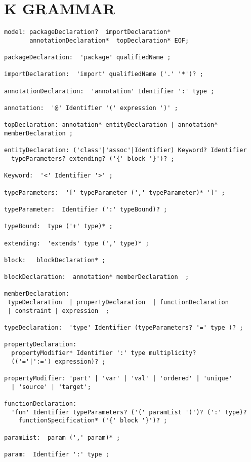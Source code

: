 \newpage
\section{K GRAMMAR}
\label{app:grammar}

{\scriptsize 

\begin{verbatim}
model: packageDeclaration?  importDeclaration*  
       annotationDeclaration*  topDeclaration* EOF;

packageDeclaration:  'package' qualifiedName ;

importDeclaration:  'import' qualifiedName ('.' '*')? ;

annotationDeclaration:  'annotation' Identifier ':' type ;

annotation:  '@' Identifier '(' expression ')' ;

topDeclaration: annotation* entityDeclaration | annotation* memberDeclaration ;

entityDeclaration: ('class'|'assoc'|Identifier) Keyword? Identifier 
  typeParameters? extending? ('{' block '}')? ;

Keyword:  '<' Identifier '>' ;

typeParameters:  '[' typeParameter (',' typeParameter)* ']' ;

typeParameter:  Identifier (':' typeBound)? ;

typeBound:  type ('+' type)* ;
      
extending:  'extends' type (',' type)* ;

block:   blockDeclaration* ;

blockDeclaration:  annotation* memberDeclaration  ;

memberDeclaration:
 typeDeclaration  | propertyDeclaration  | functionDeclaration
 | constraint | expression  ;

typeDeclaration:  'type' Identifier (typeParameters? '=' type )? ;

propertyDeclaration:
  propertyModifier* Identifier ':' type multiplicity? 
  (('='|':=') expression)? ;

propertyModifier: 'part' | 'var' | 'val' | 'ordered' | 'unique' 
  | 'source' | 'target';

functionDeclaration:
  'fun' Identifier typeParameters? ('(' paramList ')')? (':' type)?
    functionSpecification* ('{' block '}')? ;

paramList:  param (',' param)* ;

param:  Identifier ':' type ;


\end{verbatim}}
